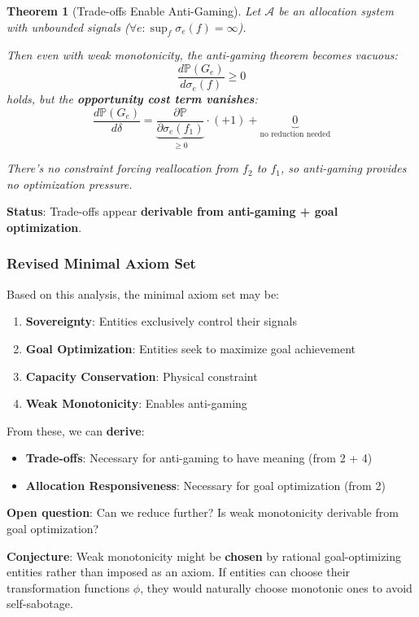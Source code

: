 \documentclass[11pt,a4paper]{article}
\newtheorem{theorem}{Theorem}[section]
\theoremstyle{definition}
\theoremstyle{remark}
\begin{document}
\begin{theorem}[Trade-offs Enable Anti-Gaming]
Let $\mathcal{A}$ be an allocation system with unbounded signals ($\forall e: \sup_{f} \sigma_e(f) = \infty$).

Then even with weak monotonicity, the anti-gaming theorem becomes vacuous:
\[ \frac{d\mathbb{P}(G_e)}{d\sigma_e(f)} \ge 0 \]
holds, but the \textbf{opportunity cost term vanishes}:
\[ \frac{d\mathbb{P}(G_e)}{d\delta} = \underbrace{\frac{\partial \mathbb{P}}{\partial \sigma_e(f_1)}}_{\ge 0} \cdot (+1) + \underbrace{0}_{\text{no reduction needed}} \]

There's no constraint forcing reallocation from $f_2$ to $f_1$, so anti-gaming provides no optimization pressure.
\end{theorem}

\textbf{Status}: Trade-offs appear \textbf{derivable from anti-gaming + goal optimization}.

\subsubsection{Revised Minimal Axiom Set}

Based on this analysis, the minimal axiom set may be:

\begin{enumerate}
\item \textbf{Sovereignty}: Entities exclusively control their signals
\item \textbf{Goal Optimization}: Entities seek to maximize goal achievement
\item \textbf{Capacity Conservation}: Physical constraint
\item \textbf{Weak Monotonicity}: Enables anti-gaming
\end{enumerate}

From these, we can \textbf{derive}:
\begin{itemize}
\item \textbf{Trade-offs}: Necessary for anti-gaming to have meaning (from 2 + 4)
\item \textbf{Allocation Responsiveness}: Necessary for goal optimization (from 2)
\end{itemize}

\textbf{Open question}: Can we reduce further? Is weak monotonicity derivable from goal optimization?

\textbf{Conjecture}: Weak monotonicity might be \textbf{chosen} by rational goal-optimizing entities rather than imposed as an axiom. If entities can choose their transformation functions $\phi$, they would naturally choose monotonic ones to avoid self-sabotage.
\end{document}
